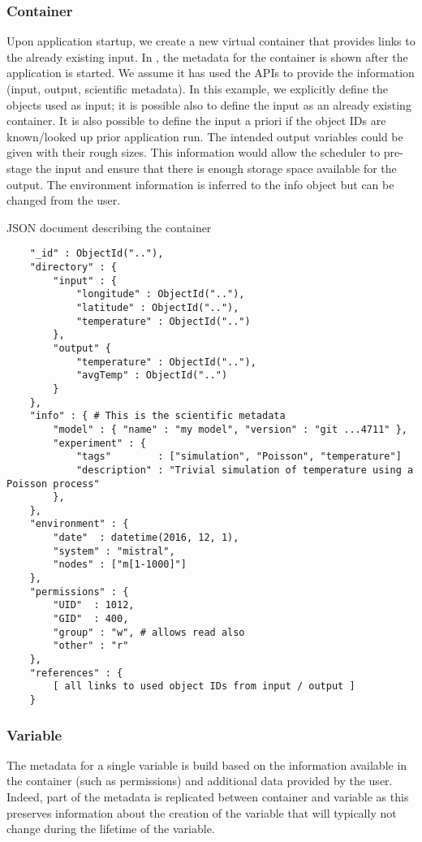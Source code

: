\subsubsection{Container}

Upon application startup, we create a new virtual container that provides links to the already existing input.
In , the metadata for the container is shown after the application is started.
We assume it has used the APIs to provide the information (input, output, scientific metadata).
In this example, we explicitly define the objects used as input; it is possible also to define
the input as an already existing container.
It is also possible to define the input a priori if the object IDs are known/looked up prior application run.
The intended output variables could be given with their rough sizes.
This information would allow the scheduler to pre-stage the input and ensure that there is enough storage space available for the output.
The environment information is inferred to the info object but can be changed from the user.

\begin{tcbcode}[label={lst:mongoContainer}]{JSON document describing the container}
	\begin{lstlisting}
	"_id" : ObjectId(".."),
	"directory" : {
		"input" : {
			"longitude" : ObjectId(".."),
			"latitude" : ObjectId(".."),
			"temperature" : ObjectId("..")
		},
		"output" {
			"temperature" : ObjectId(".."),
			"avgTemp" : ObjectId("..")
		}
	},
	"info" : { # This is the scientific metadata
		"model" : { "name" : "my model", "version" : "git ...4711" },
		"experiment" : {
			"tags"        : ["simulation", "Poisson", "temperature"]
			"description" : "Trivial simulation of temperature using a Poisson process"
		},
	},
	"environment" : {
		"date"  : datetime(2016, 12, 1),
		"system" : "mistral",
		"nodes" : ["m[1-1000]"]
	},
	"permissions" : {
		"UID"  : 1012,
		"GID"  : 400,
		"group" : "w", # allows read also
		"other" : "r"
	},
	"references" : {
		[ all links to used object IDs from input / output ]
	}
	\end{lstlisting}
\end{tcbcode}

\subsubsection{Variable}

The metadata for a single variable is build based on the information available in the container (such as permissions) and additional data provided by the user.
Indeed, part of the metadata is replicated between container and variable as this preserves information about the creation of the variable that will typically not change during the lifetime of the variable.

